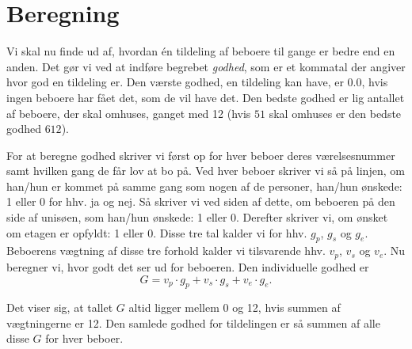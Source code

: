 \documentclass[article,oneside,11pt]{memoir}
\begin{document}
\section{Beregning}

Vi skal nu finde ud af, hvordan én tildeling af beboere til gange er bedre end
en anden. Det gør vi ved at indføre begrebet \emph{godhed}, som er et kommatal
der angiver hvor god en tildeling er. Den værste godhed, en tildeling kan have,
er $0.0$, hvis ingen beboere har fået det, som de vil have det. Den bedste
godhed er lig antallet af beboere, der skal omhuses, ganget med 12 (hvis $51$
skal omhuses er den bedste godhed $612$).

For at beregne godhed skriver vi først op for hver beboer deres værelsesnummer
samt hvilken gang de får lov at bo på. Ved hver beboer skriver vi så på linjen,
om han/hun er kommet på samme gang som nogen af de personer, han/hun ønskede: 1
eller 0 for hhv. ja og nej. Så skriver vi ved siden af dette, om beboeren på
den side af unisøen, som han/hun ønskede: 1 eller 0.  Derefter skriver vi, om
ønsket om etagen er opfyldt: 1 eller 0. Disse tre tal kalder vi for hhv. $g_p$,
$g_s$ og $g_e$.  Beboerens vægtning af disse tre forhold kalder vi tilsvarende
hhv. $v_p$, $v_s$ og $v_e$.  Nu beregner vi, hvor godt det ser ud for beboeren.
Den individuelle godhed er
\[G = v_p\cdot g_p + v_s\cdot g_s + v_e\cdot g_e.\]

Det viser sig, at tallet $G$ altid ligger mellem 0 og 12, hvis
summen af vægtningerne er 12.  Den samlede godhed for tildelingen er så summen
af alle disse $G$ for hver beboer.
\end{document}
